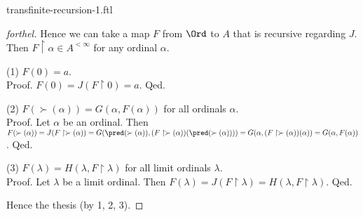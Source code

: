 \documentclass{naproche-library}
\begin{document}
\begin{smodule}{transfinite-recursion-1.ftl}
\begin{proof}[forthel]
    Hence we can take a map $F$ from $\Ord$ to $A$ that is recursive regarding $J$.
    Then $F \restriction \alpha \in A^{< \infty}$ for any ordinal $\alpha$.

    (1) $F(0) = a$. \\
    Proof.
      $F(0)
        = J(F \restriction 0)
        = a$.
    Qed.

    (2) $F(\succ(\alpha)) = G(\alpha, F(\alpha))$ for all ordinals $\alpha$. \\
    Proof.
      Let $\alpha$ be an ordinal.
      Then $F(\succ(\alpha))
        = J(F \restriction \succ(\alpha))
        = G(\pred(\succ(\alpha)), (F \restriction \succ(\alpha))(\pred(\succ(\alpha))))
        = G(\alpha, (F \restriction \succ(\alpha))(\alpha))
        = G(\alpha, F(\alpha))$.
    Qed.

    (3) $F(\lambda) = H(\lambda, F \restriction \lambda)$ for all limit ordinals $\lambda$. \\
    Proof.
      Let $\lambda$ be a limit ordinal.
      Then $F(\lambda)
        = J(F \restriction \lambda)
        = H(\lambda, F \restriction \lambda)$.
    Qed.

    Hence the thesis (by 1, 2, 3).
  \end{proof}
\end{smodule}
\end{document}
